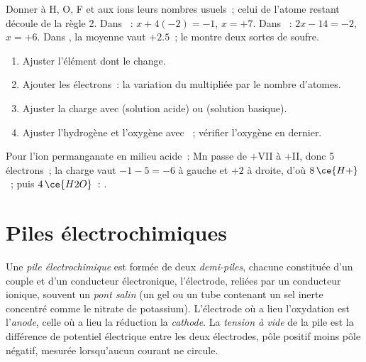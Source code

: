 \begin{method}\label{met:b1:nernst:oxidation-numbers}
Donner à H, O, F et aux ions leurs nombres usuels~; celui de l'atome
restant découle de la règle 2. Dans ~: $x + 4(-2) = -1$,
$x = +7$. Dans ~: $2x - 14 = -2$, $x = +6$. Dans
, la moyenne vaut
$+2.5$~; le  montre deux sortes de soufre.
\end{method}

\begin{method}\label{met:b1:nernst:balance-by-on}
\begin{enumerate}
  \item Ajuster l'élément dont le  change.
  \item Ajouter les électrons~: la variation du 
        multipliée par le nombre d'atomes.
  \item Ajuster la charge avec  (solution acide) ou 
        (solution basique).
  \item Ajuster l'hydrogène et l'oxygène avec ~; vérifier
        l'oxygène en dernier.
\end{enumerate}
Pour l'ion permanganate en milieu acide~: Mn passe de $+$VII à $+$II,
donc 5 électrons~; la charge vaut $-1 - 5 = -6$ à gauche et $+2$ à
droite, d'où $8\,\ce{H+}$~; puis $4\,\ce{H2O}$~:
.
\end{method}

\section{Piles électrochimiques}

\begin{definition}\label{def:b1:nernst:cell}
Une \emph{pile électrochimique} est formée de deux
\emph{demi-piles}, chacune constituée d'un couple et
d'un conducteur électronique, l'électrode, reliées par un conducteur
ionique, souvent un \emph{pont salin} (un gel ou un
tube contenant un sel inerte concentré comme le nitrate de potassium).
L'électrode où a lieu l'oxydation est l'\emph{anode}, celle
où a lieu la réduction la \emph{cathode}. La
\emph{tension à vide} de la pile est la différence de potentiel
électrique entre les deux électrodes, pôle positif moins pôle négatif,
mesurée lorsqu'aucun courant ne circule.
\end{definition}

